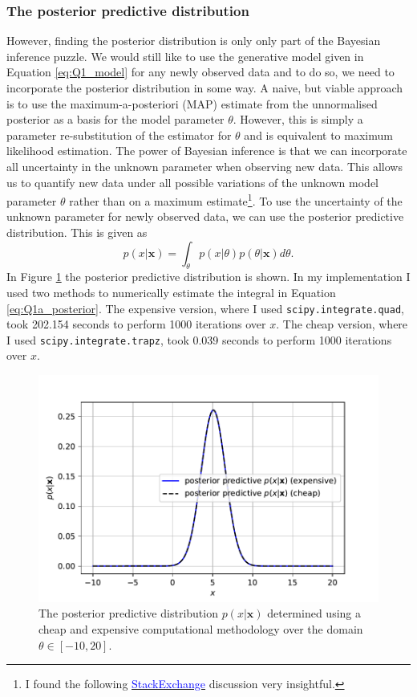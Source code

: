 \documentclass{article}
\begin{document}
\subsubsection{The posterior predictive distribution}
However, finding the posterior distribution is only only part of the Bayesian inference puzzle. We would still like to use the generative model given in Equation \eqref{eq:Q1_model} for any newly observed data and to do so, we need to incorporate the posterior distribution in some way. A naive, but viable approach is to use the maximum-a-posteriori (MAP) estimate from the unnormalised posterior as a basis for the model parameter $\theta$. However, this is simply a parameter re-substitution of the estimator for $\theta$ and is equivalent to maximum likelihood estimation. The power of Bayesian inference is that we can incorporate all uncertainty in the unknown parameter when observing new data. This allows us to quantify new data under all possible variations of the unknown model parameter $\theta$ rather than on a maximum estimate\footnote{I found the following \href{https://stats.stackexchange.com/questions/242082/posterior-predictive-distribution-vs-map-estimate}{\textcolor{blue}{StackExchange}} discussion very insightful.}. To use the uncertainty of the unknown parameter for newly observed data, we can use the posterior predictive distribution. This is given as 
\begin{equation}\label{eq:Q1a_posterior}
p(x\vert \mathbf{x}) = \int_\theta p(x \vert \theta) p(\theta \vert \mathbf{x}) d\theta.
\end{equation}
In Figure \ref{fig:Q1a_posterior_predictive} the posterior predictive distribution is shown. In my implementation I used two methods to numerically estimate the integral in Equation \eqref{eq:Q1a_posterior}. The expensive version, where I used \texttt{scipy.integrate.quad}, took 202.154 seconds to perform 1000 iterations over $x$. The cheap version, where I used \texttt{scipy.integrate.trapz}, took 0.039 seconds to perform 1000 iterations over $x$. 
\begin{figure}[htb!]
\centering
\includegraphics[scale=0.6]{Q1a_6.pdf}
\caption{The posterior predictive distribution $p(x \vert \mathbf{x})$ determined using a cheap and expensive computational methodology over the domain $\theta \in [-10, 20]$.}
\label{fig:Q1a_posterior_predictive}
\end{figure}
\end{document}
